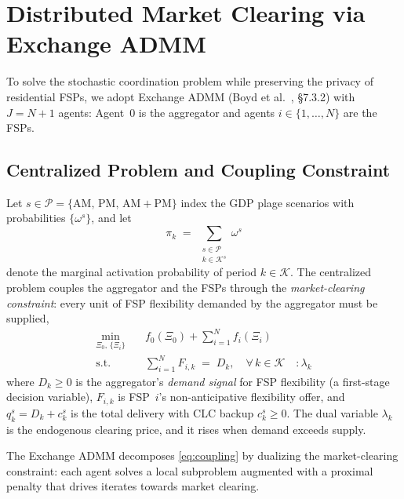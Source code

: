 \section{Distributed Market Clearing via Exchange ADMM}

To solve the stochastic coordination problem while preserving the privacy of residential FSPs, we adopt Exchange ADMM (Boyd et al.~\cite{stephen_distributed_2011}, §7.3.2) with $J = N+1$ agents: Agent~0 is the aggregator and agents $i \in \{1,\dots,N\}$ are the FSPs.

\subsection*{Centralized Problem and Coupling Constraint}

Let $s \in \mathcal{P} = \{\mathrm{AM},\,\mathrm{PM},\,\mathrm{AM{+}PM}\}$ index the GDP
plage scenarios with probabilities $\{\omega^s\}$, and let
\begin{equation}
  \pi_k \;=\; \sum_{\substack{s \in \mathcal{P} \\ k \in \mathcal{K}^s}} \omega^s
\end{equation}
denote the marginal activation probability of period $k \in \mathcal{K}$.
The centralized problem couples the aggregator and the FSPs through the \emph{market-clearing constraint}: every unit of FSP flexibility demanded by the aggregator must be supplied,
\begin{equation}
\label{eq:coupling}
\begin{aligned}
  \min_{\Xi_0,\,\{\Xi_i\}} \quad & f_0(\Xi_0) + \sum_{i=1}^{N} f_i(\Xi_i) \\[4pt]
  \text{s.t.} \quad
    & \sum_{i=1}^{N} F_{i,k} \;=\; D_k,
      \quad \forall\,k \in \mathcal{K}
      \quad :\lambda_k
\end{aligned}
\end{equation}
where $D_k \geq 0$ is the aggregator's \emph{demand signal} for FSP flexibility (a first-stage decision variable), $F_{i,k}$ is FSP~$i$'s non-anticipative flexibility offer, and $q_k^s = D_k + c_k^s$ is the total delivery with CLC backup $c_k^s \geq 0$. The dual variable $\lambda_k$ is the endogenous clearing price, and it rises when demand exceeds supply.

The Exchange ADMM decomposes \eqref{eq:coupling} by dualizing the market-clearing constraint: each agent solves a local subproblem augmented with a proximal penalty that drives iterates towards market clearing.

